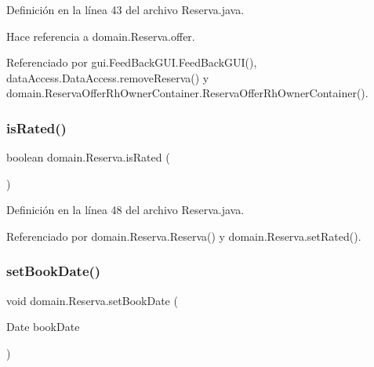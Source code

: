 Definición en la línea 43 del archivo Reserva.\+java.


\begin{DoxyCode}{0}

\end{DoxyCode}


Hace referencia a domain.\+Reserva.\+offer.



Referenciado por gui.\+Feed\+Back\+G\+U\+I.\+Feed\+Back\+G\+U\+I(), data\+Access.\+Data\+Access.\+remove\+Reserva() y domain.\+Reserva\+Offer\+Rh\+Owner\+Container.\+Reserva\+Offer\+Rh\+Owner\+Container().

\mbox{\label{classdomain_1_1_reserva_a9a1a3d154e412bd3556f95d7dbb56934}} 
\subsubsection{\texorpdfstring{isRated()}{isRated()}}
{\footnotesize\ttfamily boolean domain.\+Reserva.\+is\+Rated (\begin{DoxyParamCaption}{ }\end{DoxyParamCaption})}



Definición en la línea 48 del archivo Reserva.\+java.


\begin{DoxyCode}{0}

\end{DoxyCode}


Referenciado por domain.\+Reserva.\+Reserva() y domain.\+Reserva.\+set\+Rated().

\mbox{\label{classdomain_1_1_reserva_ab31aa9624b551e748e01a461c8e6030e}} 
\subsubsection{\texorpdfstring{setBookDate()}{setBookDate()}}
{\footnotesize\ttfamily void domain.\+Reserva.\+set\+Book\+Date (\begin{DoxyParamCaption}\item[{Date}]{book\+Date }\end{DoxyParamCaption})}



